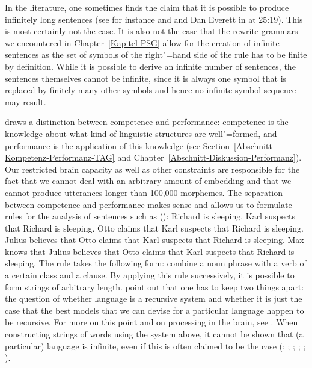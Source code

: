 In the literature, one sometimes finds the claim that it is possible to produce infinitely long
sentences (see for instance  and  and Dan Everett in  at 25:19).
This is most certainly not the case. It is also not the case that the rewrite grammars we encountered in
Chapter~\ref{Kapitel-PSG} allow for the creation of infinite sentences as the set of symbols
of the right"=hand side of the rule has to be finite by definition. While it is possible to derive
an infinite number of sentences, the sentences themselves cannot be infinite, since it is always one
symbol that is replaced by finitely many other symbols and hence no infinite symbol sequence may result.

\citet[Section~I.1]{Chomsky65a} %
draws a distinction between competence and performance:
competence is the knowledge about what kind of linguistic structures are well"=formed, and performance is the application of this knowledge (see
Section~\ref{Abschnitt-Kompetenz-Performanz-TAG} and Chapter~\ref{Abschnitt-Diskussion-Performanz}).
Our restricted brain capacity as well as other constraints are responsible for the fact that we cannot deal with an arbitrary amount of embedding
and that we cannot produce utterances longer than 100,000 morphemes. The separation between competence and performance makes sense and allows us to
formulate rules for the analysis of sentences such as ():
\eal 
\label{Beispiel-Satzeinbettung}
\ex Richard is sleeping.
\ex Karl suspects that Richard is sleeping.
\ex Otto claims that Karl suspects that Richard is sleeping.
\ex Julius believes that Otto claims that Karl suspects that Richard is sleeping.
\ex Max knows that Julius believes that Otto claims that Karl suspects that Richard is sleeping.
\zl
The rule takes the following form: combine a noun phrase with a verb of a certain class and a clause.
By applying this rule successively, it is possible to form strings of arbitrary length.
\citet{PS2010a} point out that one has to keep two things apart: the question of whether language
is a recursive system and whether it is just the case that the best models that we can devise for a particular
language happen to be recursive. For more on this point and on processing in the brain, see .
When constructing strings of words using the system above, it cannot be shown that (a particular) language is
infinite, even if this is often claimed to be the case (\citealp[--106]{Bierwisch66a}; \citealp[]{Pinker94a}; \citealp*[]{HCF2002a}; \citealp[]{MuellerLehrbuch1};
\citealp*[]{HNG2005a}; \citealp[]{KS2008a-u}).

